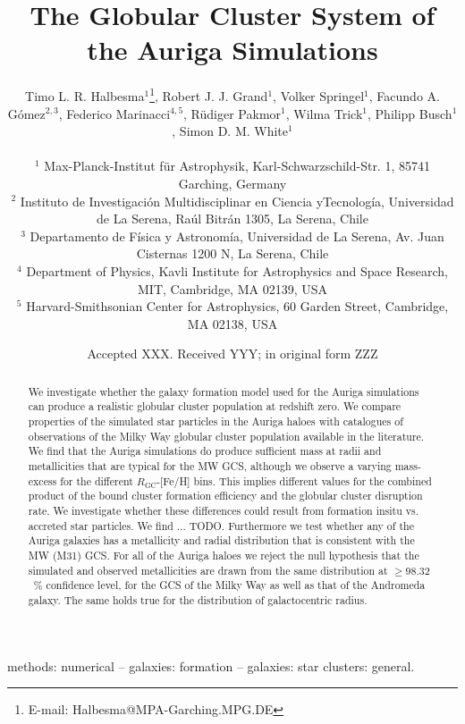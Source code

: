\documentclass[a4paper,fleqn,usenatbib]{mnras}
\title[Auriga GCS]{The Globular Cluster System of the Auriga Simulations}
\author[T. L. R. Halbesma et al.]{\parbox[t]{\textwidth}{
    Timo L. R. Halbesma$^{1}$\thanks{E-mail: Halbesma@MPA-Garching.MPG.DE},
    Robert J. J. Grand$^{1}$,
    Volker Springel$^{1}$,
    Facundo A. G\'{o}mez$^{2,3}$,
    Federico Marinacci$^{4,5}$,
    R\"{u}diger Pakmor$^{1}$,
    Wilma Trick$^{1}$,
    Philipp Busch$^{1}$,
    Simon D. M. White$^{1}$
} \vspace{10pt} \\
$^{1}$ Max-Planck-Institut f\"ur Astrophysik, Karl-Schwarzschild-Str. 1,
    85741 Garching, Germany \\
$^{2}$ Instituto de Investigaci\'{o}n Multidisciplinar en Ciencia yTecnolog\'{i}a,
    Universidad de La Serena, Ra\'{u}l Bitr\'{a}n 1305, La Serena, Chile \\
$^{3}$ Departamento de F\'{i}sica y Astronom\'{i}a, Universidad de La Serena, Av.
    Juan Cisternas 1200 N, La Serena, Chile \\
$^{4}$ Department of Physics, Kavli Institute for Astrophysics and Space Research,
    MIT, Cambridge, MA 02139, USA \\
$^{5}$ Harvard-Smithsonian Center for Astrophysics, 60 Garden Street, Cambridge,
    MA 02138, USA \\
}
\date{Accepted XXX. Received YYY; in original form ZZZ}
\begin{document}
\label{firstpage}
\pagerange{\pageref{firstpage}--\pageref{lastpage}}
\maketitle

\begin{abstract}
We investigate whether the galaxy formation model used for the Auriga simulations
can produce a realistic globular cluster population at redshift zero. We compare
properties of the simulated star particles in the Auriga haloes with
catalogues of observations of the Milky Way globular cluster population available
in the literature. We find that the Auriga simulations do produce sufficient mass
at radii and metallicities that are typical for the MW GCS, although we observe
a varying mass-excess for the different $R_{\text{GC}}$-[Fe/H] bins. This implies
different values for the combined product of the bound cluster formation efficiency
and the globular cluster disruption rate. We investigate whether these differences
could result from formation insitu vs. accreted star particles. We find ... TODO.
Furthermore we test whether any of the Auriga galaxies has a metallicity and radial
distribution that is consistent with the MW (M31) GCS. For all of the Auriga haloes
we reject the null hypothesis that the simulated and observed metallicities are
drawn from the same distribution at $\geq98.32$~\% confidence level, for the GCS
of the Milky Way as well as that of the Andromeda galaxy. The same holds true for
the distribution of galactocentric radius.
\end{abstract}

\begin{keywords}
methods: numerical -- galaxies: formation -- galaxies: star clusters: general.
\end{keywords}


\end{document}

